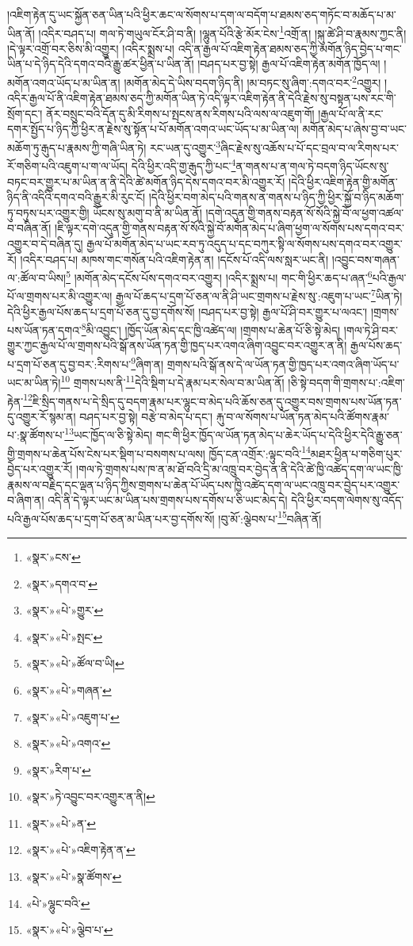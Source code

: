 །འཇིག་རྟེན་དུ་ཡང་སྐྱོན་ཅན་ཡིན་པའི་ཕྱིར་ཆང་ལ་སོགས་པ་དག་ལ་བདོག་པ་ཐམས་ཅད་གཏོང་བ་མཆོད་པ་མ་ཡིན་ནོ། །འདིར་བཤད་པ། གལ་ཏེ་གཡུལ་ངོར་ཤི་བ་ནི། །ལྷུན་པོའི་རྩེ་མོར་ངེས་\footnote{«སྣར་»ངས་}འགྲོ་ན། །སྐུ་ཚེ་ཤི་བ་རྣམས་ཀྱང་ནི། །དེ་ལྟར་འགྲོ་བར་ཅིས་མི་འགྱུར། །འདིར་སྨྲས་པ། འདི་ན་རྒྱལ་པོ་འཇིག་རྟེན་ཐམས་ཅད་ཀྱི་མགོན་ཉིད་བྱེད་པ་གང་ཡིན་པ་དེ་ཉིད་དེའི་དགའ་བའི་རྒྱུ་ཚར་ཕྱིན་པ་ཡིན་ནོ། །བཤད་པར་བྱ་སྟེ། རྒྱལ་པོ་འཇིག་རྟེན་མགོན་ཁྱོད་ལ། །མགོན་འགའ་ཡོད་པ་མ་ཡིན་ན། །མགོན་མེད་དེ་ཡིས་བདག་ཉིད་ནི། །མ་བཏང་སུ་ཞིག་:དགའ་བར་\footnote{«སྣར་»དགའ་བ་}འགྱུར། །འདིར་རྒྱལ་པོ་ནི་འཇིག་རྟེན་ཐམས་ཅད་ཀྱི་མགོན་ཡིན་ཏེ་འདི་ལྟར་འཇིག་རྟེན་ནི་དེའི་རྗེས་སུ་བསྟན་པས་རང་གི་སྲོག་དང་། ནོར་བསྲུང་བའི་དོན་དུ་མི་རིགས་པ་སྤངས་ནས་རིགས་པའི་ལས་ལ་འཇུག་གོ། །རྒྱལ་པོ་ལ་ནི་རང་དགར་སྤྱོད་པ་ཉིད་ཀྱི་ཕྱིར་ན་རྗེས་སུ་སྟོན་པ་པོ་མགོན་འགའ་ཡང་ཡོད་པ་མ་ཡིན་ལ། མགོན་མེད་པ་ཞེས་བྱ་བ་ཡང་མཆོག་ཏུ་རྒུད་པ་རྣམས་ཀྱི་གཞི་ཡིན་ཏེ། རང་ཡན་དུ་འགྱུར་\footnote{«སྣར་»«པེ་»གྱུར་}ཞིང་རྗེས་སུ་འཆོས་པ་པོ་དང་བྲལ་བ་ལ་རིགས་པར་རོ་གཅིག་པའི་འཇུག་པ་ག་ལ་ཡོད། དེའི་ཕྱིར་འདི་གྱ་རྒུད་ཀྱི་པང་\footnote{«སྣར་»«པེ་»སྤང་}ན་གནས་པ་ན་གལ་ཏེ་བདག་ཉིད་ཡོངས་སུ་བཏང་བར་གྱུར་པ་མ་ཡིན་ན་ནི་དེའི་ཚེ་མགོན་ཉིད་དེས་དགའ་བར་མི་འགྱུར་རོ། །དེའི་ཕྱིར་འཇིག་རྟེན་གྱི་མགོན་ཉིད་ནི་འདིའི་དགའ་བའི་རྒྱུར་མི་རུང་ངོ། །དེའི་ཕྱིར་བག་མེད་པའི་གནས་ན་གནས་པ་ཉིད་ཀྱི་ཕྱིར་སྐྱོ་བ་ཉིད་མཆོག་ཏུ་བཏུས་པར་འགྱུར་གྱི། ཡོངས་སུ་མགུ་བ་ནི་མ་ཡིན་ནོ། །དགེ་འདུན་གྱི་གནས་བརྟན་སོ་སོའི་སྐྱེ་བོ་ལ་ཕྱག་འཚལ་བ་བཞིན་ནོ། །ཇི་ལྟར་དགེ་འདུན་གྱི་གནས་བརྟན་སོ་སོའི་སྐྱེ་བོ་མགོན་མེད་པ་ཞིག་ཕྱག་ལ་སོགས་པས་དགའ་བར་འགྱུར་བ་དེ་བཞིན་དུ། རྒྱལ་པོ་མགོན་མེད་པ་ཡང་རབ་ཏུ་འདུད་པ་དང་བཀུར་སྟི་ལ་སོགས་པས་དགའ་བར་འགྱུར་རོ། །འདིར་བཤད་པ། མཁས་གང་གསོན་པའི་འཇིག་རྟེན་ན། །དངོས་པོ་འདི་ལས་སླར་ཡང་ནི། །འབྱུང་བས་གཞན་ལ་:ཚོལ་བ་ཡིས།\footnote{«སྣར་»«པེ་»ཚོལ་བ་ཡི།} །མགོན་མེད་དངོས་པོས་དགའ་བར་འགྱུར། །འདིར་སྨྲས་པ། གང་གི་ཕྱིར་ཆད་པ་ཞན་\footnote{«སྣར་»«པེ་»གཞན་}པའི་རྒྱལ་པོ་ལ་གྲགས་པར་མི་འགྱུར་ལ། རྒྱལ་པོ་ཆད་པ་དྲག་པོ་ཅན་ལ་ནི་ཤི་ཡང་གྲགས་པ་རྗེས་སུ་:འཇུག་པ་ཡང་\footnote{«སྣར་»«པེ་»འཇུག་པ་}ཡིན་ཏེ། དེའི་ཕྱིར་རྒྱལ་པོས་ཆད་པ་དྲག་པོ་ཅན་དུ་བྱ་དགོས་སོ། །བཤད་པར་བྱ་སྟེ། རྒྱལ་པོ་ཤི་བར་གྱུར་པ་ལའང་། །གྲགས་པས་ཡོན་ཏན་དགའ་\footnote{«སྣར་»«པེ་»འགའ་}མི་འབྱུང་། །ཁྱོད་ཡོན་མེད་དང་ཁྱི་འཚེད་ལ། །གྲགས་པ་ཆེན་པོ་ཅི་སྟེ་མེད། །གལ་ཏེ་ཤི་བར་གྱུར་ཀྱང་རྒྱལ་པོ་ལ་གྲགས་པའི་སྒོ་ནས་ཡོན་ཏན་གྱི་ཁྱད་པར་འགའ་ཞིག་འབྱུང་བར་འགྱུར་ན་ནི། རྒྱལ་པོས་ཆད་པ་དྲག་པོ་ཅན་དུ་བྱ་བར་:རིགས་པ་\footnote{«སྣར་»རིག་པ་}ཞིག་ན། གྲགས་པའི་སྒོ་ནས་དེ་ལ་ཡོན་ཏན་གྱི་ཁྱད་པར་འགའ་ཞིག་ཡོད་པ་ཡང་མ་ཡིན་ཏེ།\footnote{«སྣར་»ཏེ་འབྱུང་བར་འགྱུར་ན་ནི།} གྲགས་པས་ནི་\footnote{«སྣར་»«པེ་»ན་}དེའི་སྡིག་པ་དེ་རྣམ་པར་སེལ་བ་མ་ཡིན་ནོ། །ཅི་སྟེ་བདག་གི་གྲགས་པ་:འཇིག་རྟེན་\footnote{«སྣར་»«པེ་»འཇིག་རྟེན་ན་}ཇི་སྲིད་གནས་པ་དེ་སྲིད་དུ་བདག་རྣམ་པར་ལྷུང་བ་མེད་པའི་ཆོས་ཅན་དུ་འགྱུར་བས་གྲགས་པས་ཡོན་ཏན་དུ་འགྱུར་རོ་སྙམ་ན། བཤད་པར་བྱ་སྟེ། བརྩེ་བ་མེད་པ་དང་། རྐུ་བ་ལ་སོགས་པ་ཡོན་ཏན་མེད་པའི་ཚོགས་རྣམ་པ་:སྣ་ཚོགས་པ་\footnote{«སྣར་»«པེ་»སྣ་ཚོགས་}ཡང་ཁྱོད་ལ་ཅི་སྟེ་མེད། གང་གི་ཕྱིར་ཁྱོད་ལ་ཡོན་ཏན་མེད་པ་ཆེར་ཡོད་པ་དེའི་ཕྱིར་དེའི་རྒྱུ་ཅན་གྱི་གྲགས་པ་ཆེན་པོས་ངེས་པར་སྡིག་པ་བསགས་པ་ལས། ཁྱོད་ངན་འགྲོར་:ལྟུང་བའི་\footnote{«པེ་»ལྷུང་བའི་}མཐར་ཕྱིན་པ་གཅིག་པུར་བྱེད་པར་འགྱུར་རོ། །གལ་ཏེ་གྲགས་པས་ཁ་ན་མ་ཐོ་བའི་དྲི་མ་འཁྲུ་བར་བྱེད་ན་ནི་དེའི་ཚེ་ཁྱི་འཚེད་དག་ལ་ཡང་ཁྱི་རྣམས་ལ་བརྗིད་དང་ལྡན་པ་ཉིད་ཀྱིས་གྲགས་པ་ཆེན་པོ་ཡོད་པས་ཁྱི་འཚེད་དག་ལ་ཡང་འཁྲུ་བར་བྱེད་པར་འགྱུར་བ་ཞིག་ན། འདི་ནི་དེ་ལྟར་ཡང་མ་ཡིན་པས་གྲགས་པས་དགོས་པ་ཅི་ཡང་མེད་དེ། དེའི་ཕྱིར་བདག་ལེགས་སུ་འདོད་པའི་རྒྱལ་པོས་ཆད་པ་དྲག་པོ་ཅན་མ་ཡིན་པར་བྱ་དགོས་སོ། །བུ་མོ་:ལྕེབས་པ་\footnote{«སྣར་»«པེ་»ལྕེབ་པ་}བཞིན་ནོ། 